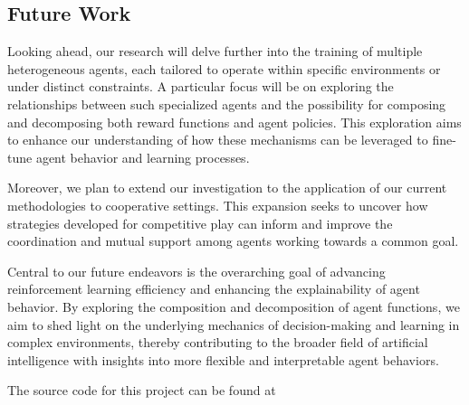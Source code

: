 \documentclass[journal]{IEEEtran}
\begin{document}
	\subsection{Future Work}
		Looking ahead, our research will delve further into the training of multiple heterogeneous agents, 
		each tailored to operate within specific environments or under distinct constraints. 
		A particular focus will be on exploring the relationships between such specialized agents and the 
		possibility for composing and decomposing both reward functions and agent policies. 
		This exploration aims to enhance our understanding of how these mechanisms can be leveraged to 
		fine-tune agent behavior and learning processes.
	
		Moreover, we plan to extend our investigation to the application of our current methodologies to cooperative settings. 
		This expansion seeks to uncover how strategies developed for competitive play can inform and 
		improve the coordination and mutual support among agents working towards a common goal.
	
		Central to our future endeavors is the overarching goal of advancing reinforcement learning efficiency 
		and enhancing the explainability of agent behavior. 
		By exploring the composition and decomposition of agent functions, 
		we aim to shed light on the underlying mechanics of decision-making and learning in complex environments, 
		thereby contributing to the broader field of artificial intelligence with insights into more flexible and interpretable agent behaviors.
		
		The source code for this project can be found at  %
		
	\begin{comment}
		
	\end{comment}
	
		
	\label{sec:references}
	
	
	
	
\end{document}
